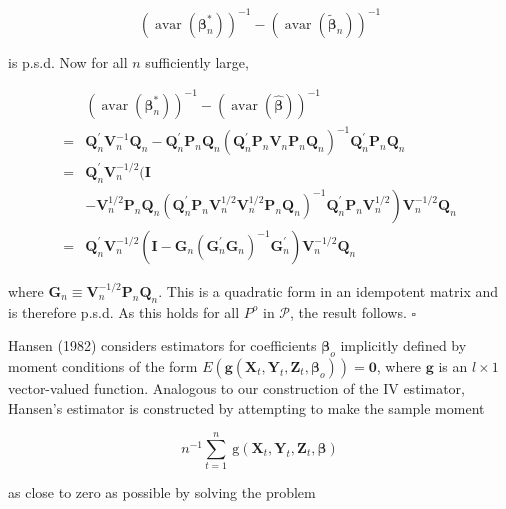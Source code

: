\documentclass[10pt]{article}
\begin{document}
$$
\left(\operatorname{avar}\left(\boldsymbol{\beta}_{n}^{*}\right)\right)^{-1}-\left(\operatorname{avar}\left(\tilde{\boldsymbol{\beta}}_{n}\right)\right)^{-1}
$$

is p.s.d. Now for all $n$ sufficiently large,

$$
\begin{aligned}
& \left(\operatorname{avar}\left(\boldsymbol{\beta}_{n}^{*}\right)\right)^{-1}-(\operatorname{avar}(\hat{\boldsymbol{\beta}}))^{-1} \\
= & \mathbf{Q}_{n}^{\prime} \mathbf{V}_{n}^{-1} \mathbf{Q}_{n}-\mathbf{Q}_{n}^{\prime} \mathbf{P}_{n} \mathbf{Q}_{n}\left(\mathbf{Q}_{n}^{\prime} \mathbf{P}_{n} \mathbf{V}_{n} \mathbf{P}_{n} \mathbf{Q}_{n}\right)^{-1} \mathbf{Q}_{n}^{\prime} \mathbf{P}_{n} \mathbf{Q}_{n} \\
= & \mathbf{Q}_{n}^{\prime} \mathbf{V}_{n}^{-1 / 2}(\mathbf{I} \\
& \left.-\mathbf{V}_{n}^{1 / 2} \mathbf{P}_{n} \mathbf{Q}_{n}\left(\mathbf{Q}_{n}^{\prime} \mathbf{P}_{n} \mathbf{V}_{n}^{1 / 2} \mathbf{V}_{n}^{1 / 2} \mathbf{P}_{n} \mathbf{Q}_{n}\right)^{-1} \mathbf{Q}_{n}^{\prime} \mathbf{P}_{n} \mathbf{V}_{n}^{1 / 2}\right) \mathbf{V}_{n}^{-1 / 2} \mathbf{Q}_{n} \\
= & \mathbf{Q}_{n}^{\prime} \mathbf{V}_{n}^{-1 / 2}\left(\mathbf{I}-\mathbf{G}_{n}\left(\mathbf{G}_{n}^{\prime} \mathbf{G}_{n}\right)^{-1} \mathbf{G}_{n}^{\prime}\right) \mathbf{V}_{n}^{-1 / 2} \mathbf{Q}_{n}
\end{aligned}
$$

where $\mathbf{G}_{n} \equiv \mathbf{V}_{n}^{-1 / 2} \mathbf{P}_{n} \mathbf{Q}_{n}$. This is a quadratic form in an idempotent matrix and is therefore p.s.d. As this holds for all $P^{o}$ in $\mathcal{P}$, the result follows. \(\square\)

Hansen (1982) considers estimators for coefficients $\boldsymbol{\beta}_{o}$ implicitly defined by moment conditions of the form $E\left(\mathbf{g}\left(\mathbf{X}_{t}, \mathbf{Y}_{t}, \mathbf{Z}_{t}, \boldsymbol{\beta}_{o}\right)\right)=\mathbf{0}$, where $\mathbf{g}$ is an $l \times 1$ vector-valued function. Analogous to our construction of the IV estimator, Hansen's estimator is constructed by attempting to make the sample moment

$$
n^{-1} \sum_{t=1}^{n} \mathrm{~g}\left(\mathbf{X}_{t}, \mathbf{Y}_{t}, \mathbf{Z}_{t}, \boldsymbol{\beta}\right)
$$

as close to zero as possible by solving the problem
\end{document}
